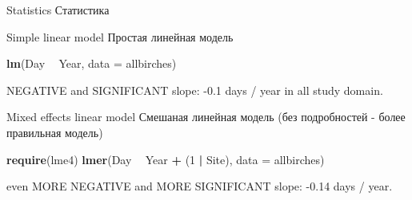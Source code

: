 \documentclass[9pt,ignorenonframetext,aspectratio=169]{beamer}
\newenvironment{Shaded}{\begin{snugshade}}{\end{snugshade}}
\newcommand{\DataTypeTok}[1]{\textcolor[rgb]{0.13,0.29,0.53}{#1}}
\newcommand{\DecValTok}[1]{\textcolor[rgb]{0.00,0.00,0.81}{#1}}
\newcommand{\KeywordTok}[1]{\textcolor[rgb]{0.13,0.29,0.53}{\textbf{#1}}}
\newcommand{\NormalTok}[1]{#1}
\newcommand{\OperatorTok}[1]{\textcolor[rgb]{0.81,0.36,0.00}{\textbf{#1}}}
\newcommand{\StringTok}[1]{\textcolor[rgb]{0.31,0.60,0.02}{#1}}
\begin{document}
\begin{frame}[fragile]{Statistics \textbar{} Статистика}
\protect\hypertarget{statistics-}{}

\bcols{}

Simple linear model \textbar{} Простая линейная модель

\footnotesize

\begin{Shaded}
\begin{Highlighting}[]
\KeywordTok{lm}\NormalTok{(Day }\OperatorTok{~}\StringTok{ }\NormalTok{Year, }\DataTypeTok{data =}\NormalTok{ allbirches)}
\end{Highlighting}
\end{Shaded}

\footnotesize

NEGATIVE and SIGNIFICANT slope: -0.1 days / year in all study domain.

\pause


Mixed effects linear model \textbar{} Смешаная линейная модель (без
подробностей - более правильная модель)

\footnotesize

\begin{Shaded}
\begin{Highlighting}[]
\KeywordTok{require}\NormalTok{(lme4)}
\KeywordTok{lmer}\NormalTok{(Day }\OperatorTok{~}\StringTok{ }\NormalTok{Year }\OperatorTok{+}\StringTok{ }\NormalTok{(}\DecValTok{1} \OperatorTok{|}\StringTok{ }\NormalTok{Site), }\DataTypeTok{data =}\NormalTok{ allbirches) }
\end{Highlighting}
\end{Shaded}

\footnotesize

even MORE NEGATIVE and MORE SIGNIFICANT slope: -0.14 days / year.

\ecols

\end{frame}
\end{document}
